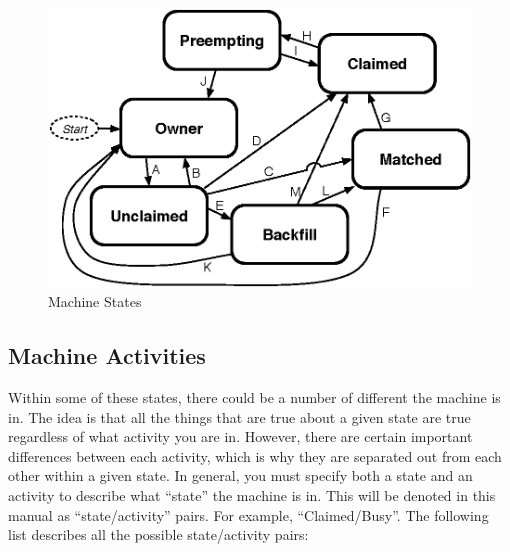 \begin{figure}[hbt]
\centering
\includegraphics{admin-man/machine-states.eps}
\caption{\label{fig:machine-states}Machine States}
\end{figure}

\subsection{\label{sec:Activities}
Machine Activities}

Within some of these states, there could be a number of different
 the machine is in.  The idea is that all the things
that are true about a given state are true regardless of what activity
you are in.  However, there are certain important differences between
each activity, which is why they are separated out from each other
within a given state.  In general, you must specify both a state and
an activity to describe what ``state'' the machine is in.  This will be
denoted in this manual as ``state/activity'' pairs.  For example,
``Claimed/Busy''.  The following list describes all the possible
state/activity pairs:


